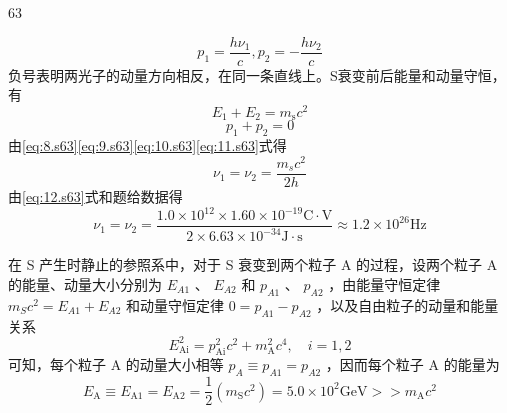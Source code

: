 \begin{solution}{63}
\begin{subsolution}
\begin{equation}
            \label{eq:8.s63}
        \end{equation}
        \begin{equation}
            p _ {1} = \frac {h \nu_{1}}{c}, p _ {2} = - \frac {h \nu_{2}}{c}
            \label{eq:9.s63}
        \end{equation}
        负号表明两光子的动量方向相反，在同一条直线上。S衰变前后能量和动量守恒，有
        \begin{equation}
            E _ {1} + E _ {2} = m _ {\mathrm{s}} c^{2}
            \label{eq:10.s63}
        \end{equation}
        \begin{equation}
            p _ {1} + p _ {2} = 0
            \label{eq:11.s63}
        \end{equation}
        由\eqref{eq:8.s63}\eqref{eq:9.s63}\eqref{eq:10.s63}\eqref{eq:11.s63}式得
        \begin{equation}
            \nu_{1} = \nu_{2} = \frac {m _ {s} c^{2}}{2 h}
            \label{eq:12.s63}
        \end{equation}
        由\eqref{eq:12.s63}式和题给数据得
        \begin{equation}
            \nu_{1} = \nu_{2} = \frac {1.0 \times 10^{12} \times 1.60 \times 10^{-19} \mathrm{C} \cdot \mathrm{V}}{2 \times 6.63 \times 10^{-34} \mathrm{J} \cdot \mathrm{s}} \approx 1.2 \times 10^{26} \mathrm{Hz}
            \label{eq:13.s63}
        \end{equation}
    \end{subsolution}
    \begin{subsolution}
        在 S 产生时静止的参照系中，对于 S 衰变到两个粒子 A 的过程，设两个粒子 A 的能量、动量大小分别为 $E_{A1}$ 、 $E_{A2}$ 和 $p_{A1}$ 、 $p_{A2}$ ，由能量守恒定律 $m_{S}c^{2}=E_{A1}+E_{A2}$ 和动量守恒定律 $0=p_{A1}-p_{A2}$ ，以及自由粒子的动量和能量关系
        \begin{equation}
            E _ {\mathrm{Ai}}^{2} = p _ {\mathrm{Ai}}^{2} c^{2} + m _ {\mathrm{A}}^{2} c^{4}, \quad i = 1, 2
            \label{eq:14.s63}
        \end{equation}
        可知，每个粒子 A 的动量大小相等 $p_{A} \equiv p_{A1} = p_{A2}$ ，因而每个粒子 A 的能量为
        \begin{equation}
            E _ {\mathrm{A}} \equiv E _ {\mathrm{A1}} = E _ {\mathrm{A2}} = \frac {1}{2} (m _ {\mathrm{S}} c^{2}) = 5.0 \times 10^{2} \mathrm{GeV} >> m _ {\mathrm{A}} c^{2}
            \label{eq:15.s63}
        \end{equation}

\end{subsolution}
\end{solution}
